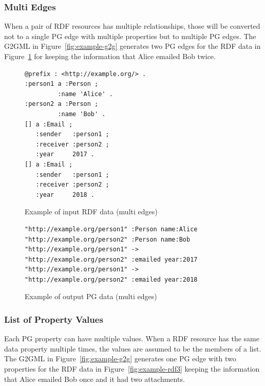 \documentclass[runningheads]{llncs}
\begin{document}
\subsubsection{Multi Edges}
When a pair of RDF resources has multiple relationships, those will be converted not to a single PG edge with multiple properties but to multiple PG edges. The G2GML in Figure~\ref{fig:example-g2g} generates two PG edges for the RDF data in Figure~\ref{fig:example-rdf2} for keeping the information that Alice emailed Bob twice.


\begin{figure}[!t]
\begin{scriptsize}
\begin{verbatim}
@prefix : <http://example.org/> .
:person1 a :Person ;
         :name 'Alice' .
:person2 a :Person ;
         :name 'Bob' .
[] a :Email ;
   :sender   :person1 ;
   :receiver :person2 ;
   :year     2017 .
[] a :Email ;
   :sender   :person1 ;
   :receiver :person2 ;
   :year     2018 .
\end{verbatim}
\end{scriptsize}
\caption{Example of input RDF data (multi edges)}
\label{fig:example-rdf2}
\end{figure}


\begin{figure}[!t]
\begin{scriptsize}
\begin{verbatim}
"http://example.org/person1" :Person name:Alice
"http://example.org/person2" :Person name:Bob
"http://example.org/person1" -> "http://example.org/person2" :emailed year:2017
"http://example.org/person1" -> "http://example.org/person2" :emailed year:2018
\end{verbatim}
\end{scriptsize}
\caption{Example of output PG data (multi edges)}
\label{fig:example-pg2}
\end{figure}

\subsubsection{List of Property Values}
Each PG property can have multiple values. When a RDF resource has the same data property multiple times, the values are assumed to be the members of a list. The G2GML in Figure~\ref{fig:example-g2g} generates one PG edge with two properties for the RDF data in Figure~\ref{fig:example-rdf3} keeping the information that Alice emailed Bob once and it had two attachments.
\end{document}
